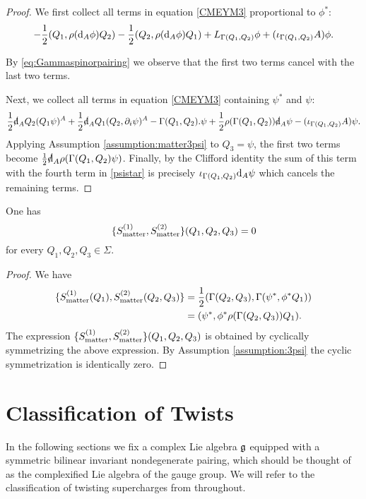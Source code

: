 \documentclass[10pt, oneside]{article}
\begin{document}
\begin{proof}
We first collect all terms in equation \eqref{CMEYM3} proportional to $\phi^*$:
\[
-\frac{1}{2} (Q_1, \rho({\rm d}_A\phi) Q_2) - \frac{1}{2} (Q_2, \rho({\rm d}_A \phi) Q_1) + L_{\Gamma(Q_1,Q_2)} \phi + (\iota_{\Gamma(Q_1, Q_2)} A)\phi.
\]

By \eqref{eq:Gammaspinorpairing} we observe that the first two terms cancel with the last two terms.

Next, we collect all terms in equation \eqref{CMEYM3} containing $\psi^*$ and $\psi$:
\begin{equation}\label{psistar}
\frac{1}{2} \sd \d_A Q_2(Q_1 \psi)^A + \frac{1}{2} \sd \d_A Q_1(Q_2, \partial_i\psi)^A - \Gamma(Q_1,Q_2) . \psi + \frac{1}{2} \rho(\Gamma(Q_1,Q_2)) \sd \d_A \psi - (\iota_{\Gamma(Q_1, Q_2)} A)\psi.
\end{equation}
Applying Assumption \ref{assumption:matter3psi} to $Q_3 = \psi$, the first two terms become $\frac{1}{2} \sd \d_A \rho(\Gamma(Q_1,Q_2) \psi)$. 
Finally, by the Clifford identity the sum of this term with the fourth term in \eqref{psistar} is precisely $\iota_{\Gamma(Q_1,Q_2)}{\rm d}_A \psi$ which cancels the remaining terms.
\end{proof}

\begin{lemma}
One has
\[\{S_{\mathrm{matter}}^{(1)}, S_{\mathrm{matter}}^{(2)}\}(Q_1, Q_2, Q_3) = 0\]
for every $Q_1, Q_2, Q_3\in \Sigma$.
\end{lemma}
\begin{proof}
We have
\begin{align*}
\{S_{\mathrm{matter}}^{(1)}(Q_1), S_{\mathrm{matter}}^{(2)}(Q_2, Q_3)\} & = \frac{1}{2} (\Gamma(Q_2, Q_3), \Gamma(\psi^*, \phi^* Q_1)) \\ & = (\psi^*, \phi^* \rho(\Gamma(Q_2,Q_3)) Q_1)  .
\end{align*}
The expression
$\{S_{\mathrm{matter}}^{(1)}, S_{\mathrm{matter}}^{(2)}\}(Q_1,Q_2,Q_3)$ is obtained by cyclically symmetrizing the above expression. By Assumption \ref{assumption:3psi} the cyclic symmetrization is identically zero.
\end{proof}

\part{Classification of Twists} \label{classification_part}

In the following sections we fix a complex Lie algebra $\mathfrak g$ equipped with a symmetric bilinear invariant nondegenerate pairing, which should be thought of as the complexified Lie algebra of the gauge group.  We will refer to the classification of twisting supercharges from \cite{ElliottSafronov} throughout.
\end{document}
